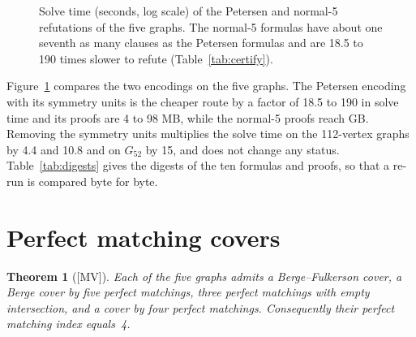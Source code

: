 \documentclass[11pt]{article}
\newtheorem{theorem}{Theorem}[section]
\theoremstyle{definition}
\theoremstyle{remark}
\newcommand{\Gfty}{G_{52}}
\newcommand{\Gftyb}{G'_{52}}
\newcommand{\Gsix}{G_{68}}
\newcommand{\mv}{\textup{[MV]}}
\begin{document}
\begin{table}[htbp]\centering\footnotesize\setlength{\tabcolsep}{4pt}

\caption{Certified refutations (CaDiCaL 1.7.3 under WSL, \texttt{drat-trim}); every check printed
\texttt{s VERIFIED}. The rows of $\Gftyb$ and $\Gsix$ were timed while other computations shared the
machine. Sizes, times and proof bytes are read from the archived manifests.}\label{tab:certify}
\end{table}

\begin{figure}[htbp]\centering

\caption{Solve time (seconds, log scale) of the Petersen and normal-5 refutations of the five
graphs. The normal-5 formulas have about one seventh as many clauses as the Petersen formulas and
are 18.5 to 190 times slower to refute (Table~\ref{tab:certify}).}\label{fig:certify}
\end{figure}

Figure~\ref{fig:certify} compares the two encodings on the five graphs. The Petersen encoding with its symmetry units is the cheaper route by a factor of 18.5 to 190 in solve
time and its proofs are 4 to 98 MB, while the normal-5 proofs reach \MaxProofGB{} GB. Removing the
symmetry units multiplies the solve time on the 112-vertex graphs by 4.4 and 10.8 and on $\Gfty$ by
15, and does not change any status. Table~\ref{tab:digests} gives the digests of the ten formulas and proofs, so that a
re-run is compared byte for byte.

\begin{table}[htbp]\centering\footnotesize\setlength{\tabcolsep}{4pt}

\caption{SHA-256 digests (first 16 hexadecimal digits) of the DIMACS formulas and DRAT proofs of
Table~\ref{tab:certify}, from the archived manifests; the full digests are in the manifests.}\label{tab:digests}
\end{table}

\section{Perfect matching covers}\label{sec:covers}

\begin{theorem}[\mv]\label{thm:covers}
Each of the five graphs admits a Berge--Fulkerson cover, a Berge cover by five perfect
matchings, three perfect matchings with empty intersection, and a cover by four perfect
matchings. Consequently their perfect matching index equals~4.
\end{theorem}
\end{document}
